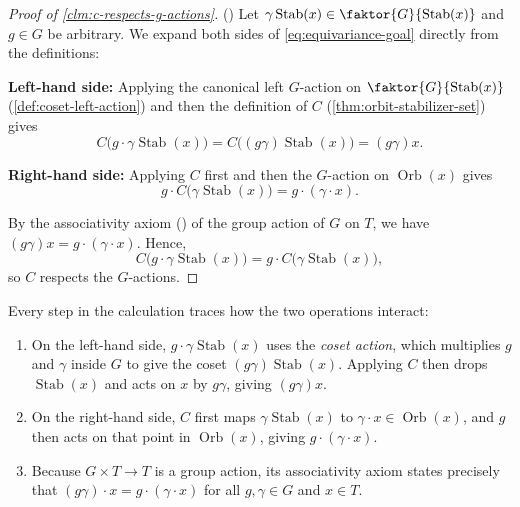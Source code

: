 \begin{content}
\begin{proof}[Proof of \cref{clm:c-respects-g-actions}]
() Let $\gamma \operatorname{Stab}(x) \in \faktor{G}{\operatorname{Stab}(x)}$ and $g \in G$ be arbitrary. We expand both sides of \eqref{eq:equivariance-goal} directly from the definitions:

\textbf{Left-hand side:} Applying the canonical left $G$-action on $\faktor{G}{\operatorname{Stab}(x)}$ (\cref{def:coset-left-action}) and then the definition of $C$ (\cref{thm:orbit-stabilizer-set}) gives
\[
C\bigl(g \cdot \gamma \operatorname{Stab}(x)\bigr) = C\bigl((g\gamma)\operatorname{Stab}(x)\bigr) = (g\gamma)x.
\]

\textbf{Right-hand side:} Applying $C$ first and then the $G$-action on $\operatorname{Orb}(x)$ gives
\[
g \cdot C\bigl(\gamma \operatorname{Stab}(x)\bigr) = g \cdot (\gamma \cdot x).
\]

By the associativity axiom () of the group action of $G$ on $T$, we have $(g\gamma)x = g \cdot (\gamma \cdot x)$. Hence,
\[
C\bigl(g \cdot \gamma \operatorname{Stab}(x)\bigr) = g \cdot C\bigl(\gamma \operatorname{Stab}(x)\bigr),
\]
so $C$ respects the $G$-actions.
\end{proof}

\begin{steps}
Every step in the calculation traces how the two operations interact:
\begin{enumerate}[label=\textbf{\arabic*.}]
    \item On the left-hand side, $g \cdot \gamma \operatorname{Stab}(x)$ uses the \emph{coset action}, which multiplies $g$ and $\gamma$ inside $G$ to give the coset $(g\gamma)\operatorname{Stab}(x)$. Applying $C$ then drops $\operatorname{Stab}(x)$ and acts on $x$ by $g\gamma$, giving $(g\gamma)x$.
    \item On the right-hand side, $C$ first maps $\gamma\operatorname{Stab}(x)$ to $\gamma \cdot x \in \operatorname{Orb}(x)$, and $g$ then acts on that point in $\operatorname{Orb}(x)$, giving $g \cdot (\gamma \cdot x)$.
    \item Because $G \times T \to T$ is a group action, its associativity axiom states precisely that $(g\gamma) \cdot x = g \cdot (\gamma \cdot x)$ for all $g, \gamma \in G$ and $x \in T$.
\end{enumerate}
\end{steps}
\end{content}

